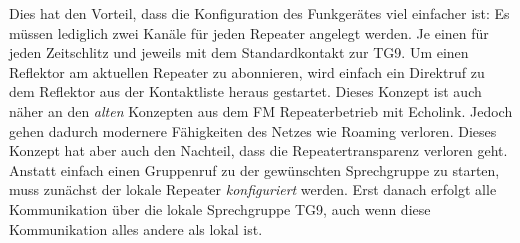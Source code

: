 Dies hat den Vorteil, dass die Konfiguration des Funkgerätes viel einfacher ist: Es müssen lediglich zwei Kanäle für jeden Repeater angelegt werden. Je einen für jeden Zeitschlitz und jeweils mit dem Standardkontakt zur TG9. Um einen Reflektor am aktuellen Repeater zu abonnieren, wird einfach ein Direktruf zu dem Reflektor aus der Kontaktliste heraus gestartet. Dieses Konzept ist auch näher an den \emph{alten} Konzepten aus dem FM Repeaterbetrieb mit Echolink. Jedoch gehen dadurch modernere Fähigkeiten des Netzes wie Roaming verloren. Dieses Konzept hat aber auch den Nachteil, dass die Repeatertransparenz verloren geht. Anstatt einfach einen Gruppenruf zu der gewünschten Sprechgruppe zu starten, muss zunächst der lokale Repeater \emph{konfiguriert} werden. Erst danach erfolgt alle Kommunikation über die lokale Sprechgruppe TG9, auch wenn diese Kommunikation alles andere als lokal ist. 